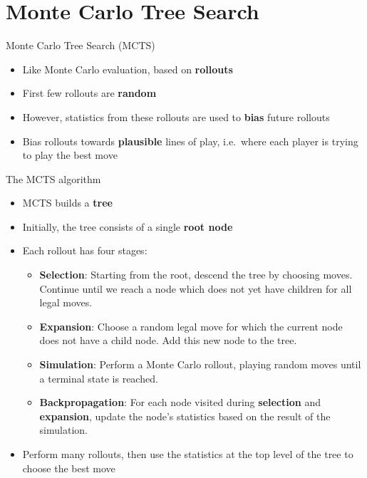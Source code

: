 \part{Monte Carlo Tree Search}
\frame{\partpage}

\begin{frame}{Monte Carlo Tree Search (MCTS)}
	\begin{itemize}
		\pause\item Like Monte Carlo evaluation, based on \textbf{rollouts}
		\pause\item First few rollouts are \textbf{random}
		\pause\item However, statistics from these rollouts are used to \textbf{bias} future rollouts
		\pause\item Bias rollouts towards \textbf{plausible} lines of play,
			i.e.\ where each player is trying to play the best move
	\end{itemize}
\end{frame}

\begin{frame}{The MCTS algorithm}
	\begin{itemize}
		\pause\item MCTS builds a \textbf{tree}
		\pause\item Initially, the tree consists of a single \textbf{root node}
		\pause\item Each rollout has four stages:
			\begin{itemize}
				\pause\item \textbf{Selection}: Starting from the root, descend the tree by choosing moves.
					Continue until we reach a node which does not yet have children for all legal moves.
				\pause\item \textbf{Expansion}: Choose a random legal move for which the current node does not have a child node.
					Add this new node to the tree.
				\pause\item \textbf{Simulation}: Perform a Monte Carlo rollout, playing random moves until a terminal state is reached.
				\pause\item \textbf{Backpropagation}: For each node visited during \textbf{selection} and \textbf{expansion},
					update the node's statistics based on the result of the simulation.
			\end{itemize}
		\pause\item Perform many rollouts, then use the statistics at the top level of the tree to choose the best move
	\end{itemize}
\end{frame}

